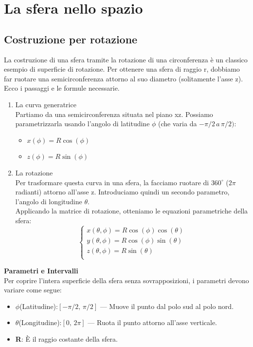 \documentclass[a4paper,14pt]{article}
\begin{document}
\section{La sfera nello spazio}
\subsection{Costruzione per rotazione}
La costruzione di una sfera tramite la rotazione di una circonferenza è un classico esempio di
superficie di rotazione. Per ottenere una sfera di raggio r, dobbiamo far ruotare una semicirconferenza attorno al suo diametro (solitamente l'asse z). Ecco i passaggi e le formule necessarie.
\begin{enumerate}
\item La curva generatrice\\
Partiamo da una semicirconferenza situata nel piano xz. Possiamo parametrizzarla usando l'angolo di latitudine \(\phi\) (che varia da \(-\pi/2\, a\, \pi/2)\):
\begin{itemize}
\item \(x(\phi) = R\cos(\phi)\)
\item \(z(\phi) = R\sin(\phi)\)
\end{itemize}
\item La rotazione\\
Per trasformare questa curva in una sfera, la facciamo ruotare di \(360^{\circ}\) (\(2\pi\) radianti) attorno all'asse z. Introduciamo quindi un secondo parametro, l'angolo di longitudine
\(\theta\). \\
Applicando la matrice di rotazione, otteniamo le equazioni parametriche della sfera:
\[
\begin{cases}
x(\theta,\phi) = R\cos(\phi)\cos(\theta)\\
y(\theta,\phi) = R\cos(\phi)\sin(\theta)\\
z(\theta,\phi) = R\sin(\theta)\\
\end{cases}
\]
\end{enumerate}
\textbf{Parametri e Intervalli}\\
Per coprire l'intera superficie della sfera senza sovrapposizioni, i parametri devono variare come segue:
\begin{itemize}
\item \(\phi\)(Latitudine):\([-\pi/2,\, \pi/2]\) — Muove il punto dal polo sud al polo nord.
\item \(\theta\)(Longitudine):\([0,\, 2\pi]\) — Ruota il punto attorno all'asse verticale.
\item \textbf{R}: È il raggio costante della sfera.
\end{itemize}
\end{document}
